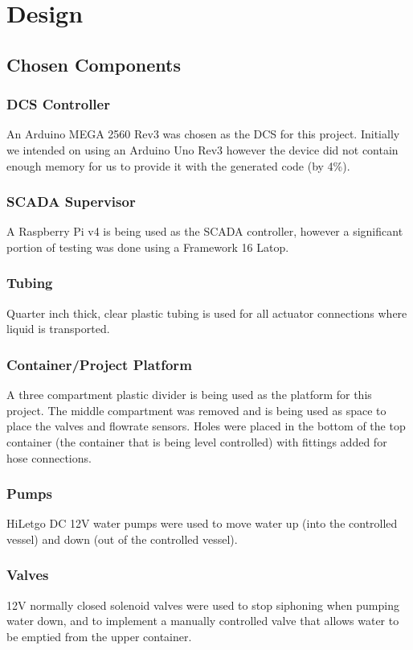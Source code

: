 \documentclass[../main.tex]{subfiles}
\begin{document}
\section{Design}
\label{sec:design}

\subsection{Chosen Components}

\subsubsection{DCS Controller} An Arduino MEGA 2560 Rev3 was chosen as the DCS for this project. Initially we intended on using an Arduino Uno Rev3 however the device did not contain enough memory for us to provide it with the generated code (by 4\%).

\subsubsection{SCADA Supervisor} A Raspberry Pi v4 is being used as the SCADA controller, however a significant portion of testing was done using a Framework 16 Latop.

\subsubsection{Tubing} Quarter inch thick, clear plastic tubing is used for all actuator connections where liquid is transported.

\subsubsection{Container/Project Platform} A three compartment plastic divider is being used as the platform for this project. The middle compartment was removed and is being used as space to place the valves and flowrate sensors. Holes were placed in the bottom of the top container (the container that is being level controlled) with fittings added for hose connections.

\subsubsection{Pumps} HiLetgo DC 12V water pumps were used to move water up (into the controlled vessel) and down (out of the controlled vessel).

\subsubsection{Valves} 12V normally closed solenoid valves were used to stop siphoning when pumping water down, and to implement a manually controlled valve that allows water to be emptied from the upper container.
\end{document}
